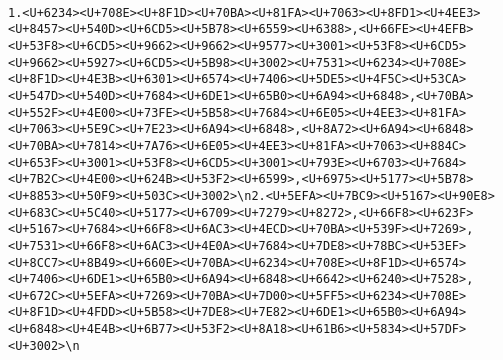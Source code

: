 \documentclass[
]{article}
\begin{document}
\begin{verbatim}
                                                                                                                       1.<U+6234><U+708E><U+8F1D><U+70BA><U+81FA><U+7063><U+8FD1><U+4EE3><U+8457><U+540D><U+6CD5><U+5B78><U+6559><U+6388>,<U+66FE><U+4EFB><U+53F8><U+6CD5><U+9662><U+9662><U+9577><U+3001><U+53F8><U+6CD5><U+9662><U+5927><U+6CD5><U+5B98><U+3002><U+7531><U+6234><U+708E><U+8F1D><U+4E3B><U+6301><U+6574><U+7406><U+5DE5><U+4F5C><U+53CA><U+547D><U+540D><U+7684><U+6DE1><U+65B0><U+6A94><U+6848>,<U+70BA><U+552F><U+4E00><U+73FE><U+5B58><U+7684><U+6E05><U+4EE3><U+81FA><U+7063><U+5E9C><U+7E23><U+6A94><U+6848>,<U+8A72><U+6A94><U+6848><U+70BA><U+7814><U+7A76><U+6E05><U+4EE3><U+81FA><U+7063><U+884C><U+653F><U+3001><U+53F8><U+6CD5><U+3001><U+793E><U+6703><U+7684><U+7B2C><U+4E00><U+624B><U+53F2><U+6599>,<U+6975><U+5177><U+5B78><U+8853><U+50F9><U+503C><U+3002>\n2.<U+5EFA><U+7BC9><U+5167><U+90E8><U+683C><U+5C40><U+5177><U+6709><U+7279><U+8272>,<U+66F8><U+623F><U+5167><U+7684><U+66F8><U+6AC3><U+4ECD><U+70BA><U+539F><U+7269>,<U+7531><U+66F8><U+6AC3><U+4E0A><U+7684><U+7DE8><U+78BC><U+53EF><U+8CC7><U+8B49><U+660E><U+70BA><U+6234><U+708E><U+8F1D><U+6574><U+7406><U+6DE1><U+65B0><U+6A94><U+6848><U+6642><U+6240><U+7528>,<U+672C><U+5EFA><U+7269><U+70BA><U+7D00><U+5FF5><U+6234><U+708E><U+8F1D><U+4FDD><U+5B58><U+7DE8><U+7E82><U+6DE1><U+65B0><U+6A94><U+6848><U+4E4B><U+6B77><U+53F2><U+8A18><U+61B6><U+5834><U+57DF><U+3002>\n

\end{verbatim}
\end{document}
